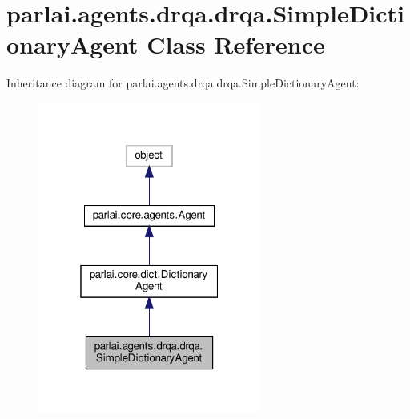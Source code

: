 \hypertarget{classparlai_1_1agents_1_1drqa_1_1drqa_1_1SimpleDictionaryAgent}{}\section{parlai.\+agents.\+drqa.\+drqa.\+Simple\+Dictionary\+Agent Class Reference}
\label{classparlai_1_1agents_1_1drqa_1_1drqa_1_1SimpleDictionaryAgent}


Inheritance diagram for parlai.\+agents.\+drqa.\+drqa.\+Simple\+Dictionary\+Agent\+:
\nopagebreak
\begin{figure}[H]
\begin{center}
\leavevmode
\includegraphics[width=208pt]{dc/dbf/classparlai_1_1agents_1_1drqa_1_1drqa_1_1SimpleDictionaryAgent__inherit__graph}
\end{center}
\end{figure}


